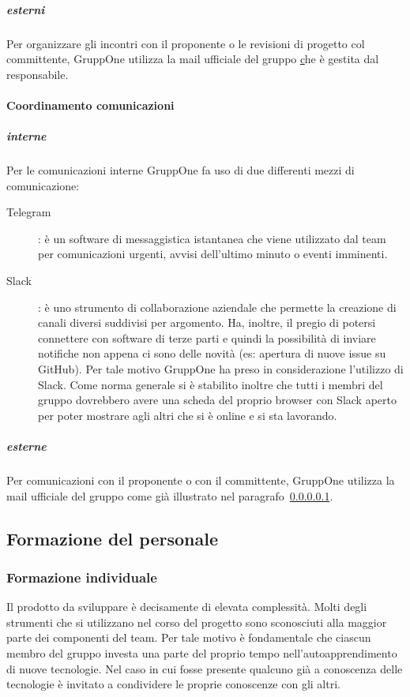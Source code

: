 \documentclass[../norme-di-progetto.tex]{subfiles}
\begin{document}
\subparagraph{esterni}%
\label{subp:coordinamento_incontri/esterni}
Per organizzare gli incontri con il proponente o le revisioni di progetto col committente, GruppOne utilizza la mail ufficiale del gruppo \href{gruppone.swe@gmail.com} che è gestita dal responsabile.

\paragraph{Coordinamento comunicazioni}%
\label{par:coordinamento_comunicazioni}

\subparagraph{interne}%
\label{subp:coordinamento_comunicazioni/interne}
Per le comunicazioni interne GruppOne fa uso di due differenti mezzi di comunicazione:
\begin{description}
  \item [Telegram]: è un software di messaggistica istantanea che viene utilizzato dal team per comunicazioni urgenti, avvisi dell'ultimo minuto o eventi imminenti.
  \item [Slack]: è uno strumento di collaborazione aziendale che permette la creazione di canali diversi suddivisi per argomento. Ha, inoltre, il pregio di potersi connettere con software di terze parti e quindi la possibilità di inviare notifiche non appena ci sono delle novità (es: apertura di nuove issue su GitHub). Per tale motivo GruppOne ha preso in considerazione l'utilizzo di Slack. Come norma generale si è stabilito inoltre che tutti i membri del gruppo dovrebbero avere una scheda del proprio browser con Slack aperto per poter mostrare agli altri che si è online e si sta lavorando.
\end{description}

\subparagraph{esterne}%
\label{subp:esterne}
Per comunicazioni con il proponente o con il committente, GruppOne utilizza la mail ufficiale del gruppo come già illustrato nel paragrafo~\ref{subp:coordinamento_incontri/esterni}.

\subsection{Formazione del personale}%
\label{sub:formazione_del_personale}

\subsubsection{Formazione individuale}%
\label{subs:formazione_individuale}

Il prodotto da sviluppare è decisamente di elevata complessità.
Molti degli strumenti che si utilizzano nel corso del progetto sono sconosciuti alla maggior parte dei componenti del team.
Per tale motivo è fondamentale che ciascun membro del gruppo investa una parte del proprio tempo nell'autoapprendimento di nuove tecnologie.
Nel caso in cui fosse presente qualcuno già a conoscenza delle tecnologie è invitato a condividere le proprie conoscenze con gli altri.
\end{document}
